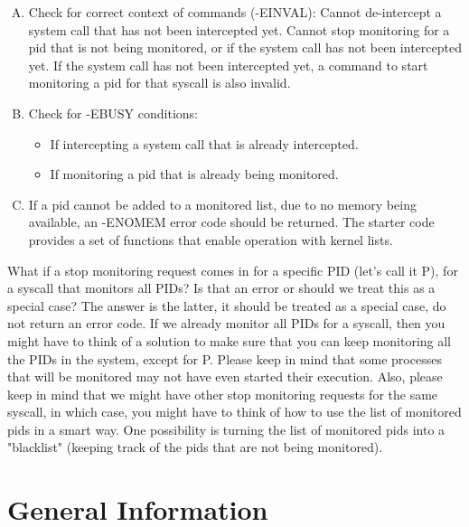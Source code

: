 \documentclass[12pt]{article}
\begin{document}
\begin{itemize}
\begin{enumerate}[A.]
    \item Check for correct context of commands (-EINVAL):
    Cannot de-intercept a system call that has not been intercepted yet.
    Cannot stop monitoring for a pid that is not being monitored, or \color{red}if
    the system call has not been intercepted yet. If the system call has not been
    intercepted yet, a command to start monitoring a pid for that syscall is also
    invalid\color{black}.
    \item Check for -EBUSY conditions:
    \begin{itemize}
        \item If intercepting a system call that is already intercepted.
        \item If monitoring a pid that is already being monitored.
    \end{itemize}
    \item If a pid cannot be added to a monitored list, due to no memory being available, an -ENOMEM error code should be returned. The starter code provides a set of functions that enable operation with kernel lists.
    \end{enumerate}

    \bigskip

    What if a stop monitoring request comes in for a specific PID (let's call it P),
    for a syscall that monitors all PIDs? Is that an error or should we treat
    this as a special case? The answer is the latter, it should be treated as a
    special case, do not return an error code. If we already monitor all PIDs for
    a syscall, then you might have to think of a solution to make sure that you
    can keep monitoring all the PIDs in the system, except for P. Please keep in
    mind that some processes that will be monitored may not have even started
    their execution. Also, please keep in mind that we might have other stop
    monitoring requests for the same syscall, in which case, you might have to
    think of how to use the list of monitored pids in a smart way. One possibility
    is turning the list of monitored pids into a "blacklist" (keeping track of the
    pids that are not being monitored).
\end{itemize}

\section{General Information}

\bigskip
\end{document}
